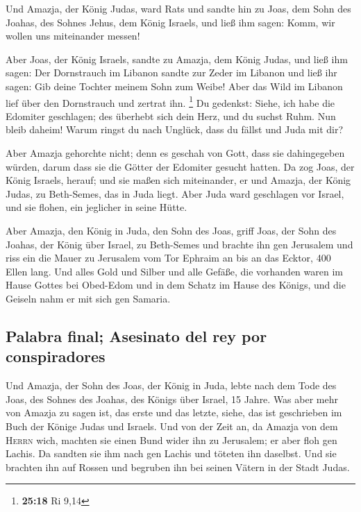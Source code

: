  Und Amazja, der König Judas, ward Rats und sandte hin zu
Joas, dem Sohn des Joahas, des Sohnes Jehus, dem König Israels, und ließ
ihm sagen: Komm, wir wollen uns miteinander messen!

 Aber Joas, der König Israels, sandte zu Amazja, dem
König Judas, und ließ ihm sagen: Der Dornstrauch im Libanon sandte zur
Zeder im Libanon und ließ ihr sagen: Gib deine Tochter meinem Sohn zum
Weibe! Aber das Wild im Libanon lief über den Dornstrauch und zertrat
ihn. \footnote{\textbf{25:18} Ri 9,14}  Du gedenkst:
Siehe, ich habe die Edomiter geschlagen; des überhebt sich dein Herz,
und du suchst Ruhm. Nun bleib daheim! Warum ringst du nach Unglück, dass
du fällst und Juda mit dir?

 Aber Amazja gehorchte nicht; denn es geschah von Gott,
dass sie dahingegeben würden, darum dass sie die Götter der Edomiter
gesucht hatten.  Da zog Joas, der König Israels, herauf;
und sie maßen sich miteinander, er und Amazja, der König Judas, zu
Beth-Semes, das in Juda liegt.  Aber Juda ward geschlagen
vor Israel, und sie flohen, ein jeglicher in seine Hütte.

 Aber Amazja, den König in Juda, den Sohn des Joas, griff
Joas, der Sohn des Joahas, der König über Israel, zu Beth-Semes und
brachte ihn gen Jerusalem und riss ein die Mauer zu Jerusalem vom Tor
Ephraim an bis an das Ecktor, 400 Ellen lang.  Und alles
Gold und Silber und alle Gefäße, die vorhanden waren im Hause Gottes bei
Obed-Edom und in dem Schatz im Hause des Königs, und die Geiseln nahm er
mit sich gen Samaria.

\hypertarget{palabra-final-asesinato-del-rey-por-conspiradores}{%
\subsection{Palabra final; Asesinato del rey por
conspiradores}\label{palabra-final-asesinato-del-rey-por-conspiradores}}

 Und Amazja, der Sohn des Joas, der König in Juda, lebte
nach dem Tode des Joas, des Sohnes des Joahas, des Königs über Israel,
15 Jahre.  Was aber mehr von Amazja zu sagen ist, das
erste und das letzte, siehe, das ist geschrieben im Buch der Könige
Judas und Israels.  Und von der Zeit an, da Amazja von
dem \textsc{Herrn} wich, machten sie einen Bund wider ihn zu Jerusalem;
er aber floh gen Lachis. Da sandten sie ihm nach gen Lachis und töteten
ihn daselbst.  Und sie brachten ihn auf Rossen und
begruben ihn bei seinen Vätern in der Stadt Judas.

